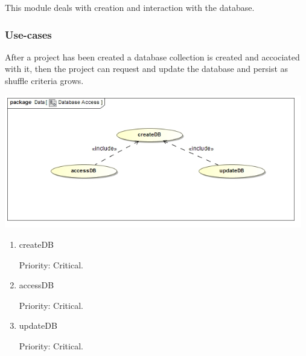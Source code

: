 This module deals with creation and interaction with the database.

\subsubsection{Use-cases}
After a project has been created a database collection is created and accociated with it, then the project can request and update the database and persist as shuffle criteria grows.\par
\includegraphics[width=13cm]{./graphics/databaseAccessUseCase.jpg}
    \rule{0\linewidth}{0.15\linewidth}\par
\begin{enumerate}
\item createDB\par
Priority: Critical.\par



\item accessDB\par
Priority: Critical.\par

\item updateDB\par
Priority: Critical.\par


\end{enumerate}